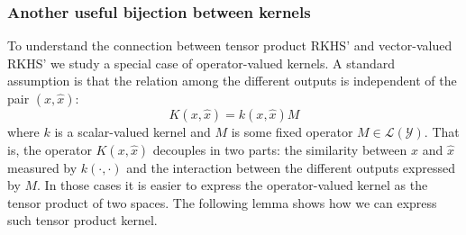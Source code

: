 \subsubsection*{Another useful bijection between kernels}
To understand the connection between tensor product RKHS' and vector-valued RKHS' we study a special case of operator-valued kernels.
A standard assumption is that the relation among the different outputs is independent of the pair $(x, \hat{x})$:
$$ K(x, \hat{x})  = k(x, \hat{x}) M$$
where $k$ is a scalar-valued kernel and $M$ is some fixed operator $M \in \mathcal{L}(\mathcal{Y})$. That is, the operator $K(x, \hat{x})$ decouples in two parts: the similarity between $x$ and $\hat{x}$ measured by $k(\cdot,\cdot)$ and the interaction between the different outputs expressed by $M$. In those cases it is easier to express the operator-valued kernel as the tensor product of two spaces. The following lemma shows how we can express such tensor product kernel.
%


